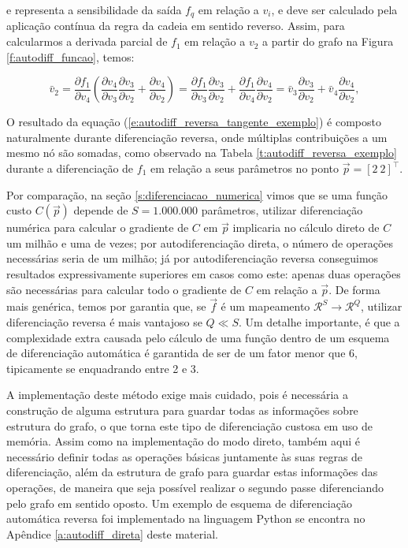       \noindent e representa a sensibilidade da saída $f_q$ em relação a $v_i$, e deve ser calculado pela aplicação contínua da regra da cadeia em sentido reverso. Assim, para calcularmos a derivada parcial de $f_1$ em relação a $v_2$ a partir do grafo na Figura \ref{f:autodiff_funcao}, temos:

      \begin{equation} \label{e:autodiff_reversa_tangente_exemplo}
        \bar{v}_2
        =
        \frac{\partial f_1}{\partial v_4} \left(
          \frac{\partial v_4}{\partial v_3} \frac{\partial v_3}{\partial v_2} +
          \frac{\partial v_4}{\partial v_2}
        \right)
        =
        \frac{\partial f_1}{\partial v_3} \frac{\partial v_3}{\partial v_2} +
        \frac{\partial f_1}{\partial v_4} \frac{\partial v_4}{\partial v_2}
        =
        \bar{v}_3 \frac{\partial v_3}{\partial v_2} +
        \bar{v}_4 \frac{\partial v_4}{\partial v_2}
        ,
      \end{equation}

      O resultado da equação (\ref{e:autodiff_reversa_tangente_exemplo}) é composto naturalmente durante diferenciação reversa, onde múltiplas contribuições a um mesmo nó são somadas, como observado na Tabela \ref{t:autodiff_reversa_exemplo} durante a diferenciação de $f_1$ em relação a seus parâmetros no ponto $\vec{p} = [2\ 2]^\top$.

      Por comparação, na seção \ref{s:diferenciacao_numerica} vimos que se uma função custo $C(\vec{p})$ depende de $S=1.000.000$ parâmetros, utilizar diferenciação numérica para calcular o gradiente de $C$ em $\vec{p}$ implicaria no cálculo direto de $C$ um milhão e uma de vezes; por autodiferenciação direta, o número de operações necessárias seria de um milhão; já por autodiferenciação reversa conseguimos resultados expressivamente superiores em casos como este: apenas duas operações são necessárias para calcular todo o gradiente de $C$ em relação a $\vec{p}$. De forma mais genérica, temos por garantia que, se $\vec{f}$ é um mapeamento $\mathcal{R}^S \longrightarrow \mathcal{R}^Q$, utilizar diferenciação reversa é mais vantajoso se $Q\ll S$. Um detalhe importante, é que a complexidade extra causada pelo cálculo de uma função dentro de um esquema de diferenciação automática é garantida de ser de um fator menor que 6, tipicamente se enquadrando entre 2 e 3.

      A implementação deste método exige mais cuidado, pois é necessária a construção de alguma estrutura para guardar todas as informações sobre estrutura do grafo, o que torna este tipo de diferenciação custosa em uso de memória. Assim como na implementação do modo direto, também aqui é necessário definir todas as operações básicas juntamente às suas regras de diferenciação, além da estrutura de grafo para guardar estas informações das operações, de maneira que seja possível realizar o segundo passe diferenciando pelo grafo em sentido oposto. Um exemplo de esquema de diferenciação automática reversa foi implementado na linguagem Python se encontra no Apêndice \ref{a:autodiff_direta} deste material.

